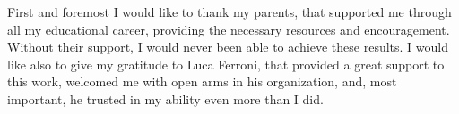 \documentclass[a4paper,twoside,11pt]{report}
\begin{document}


\copertinatesi 
{}
\indice
\indicefigure
\indicetabelle
\iniziatesto









\appendix



\ringraziamenti

First and foremost I would like to thank my parents, that supported me through
all my educational career, providing the necessary resources and encouragement.
Without their support, I would never been able to achieve these results. I would
like also to give my gratitude to Luca Ferroni, that provided a great support to
this work, welcomed me with open arms in his organization, and, most important,
he trusted in my ability even more than I did.
\end{document}
